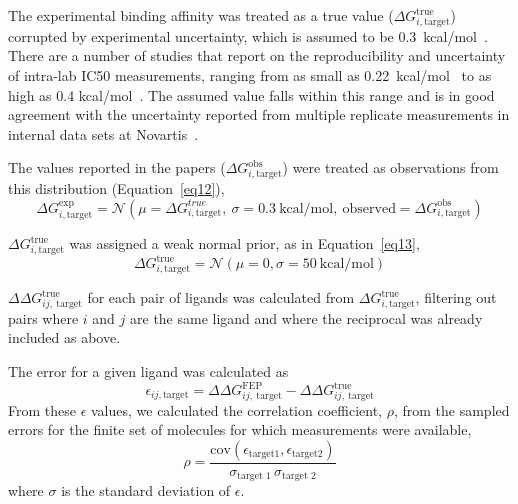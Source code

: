 \documentclass[phd,tocprelim]{cornell}
\begin{document}
The experimental binding affinity was treated as a true value ($\Delta G^\text{true}_{i,\text{target}}$) corrupted by experimental uncertainty, which is assumed to be 0.3~kcal/mol~\citep{BROWN2009420}. There are a number of studies that report on the reproducibility and uncertainty of intra-lab IC50 measurements, ranging from as small as 0.22~kcal/mol~\citep{Hauser:2018vz} to as high as 0.4 kcal/mol~\citep{BROWN2009420}. The assumed value falls within this range and is in good agreement with the uncertainty reported from multiple replicate measurements in internal data sets at Novartis~\citep{Kalliokoski:PloSOne:2013}. 

The values reported in the papers ($\Delta G^\text{obs}_{i,\text{target}}$) were treated as observations from this distribution (Equation~\ref{eq12}),
\begin{equation}
\Delta G^\text{exp}_{i,\text{target}} = \mathcal{N}(\mu=\Delta G^{true}_{i,\text{target}}, ~\sigma=0.3~\text{kcal/mol},~\text{observed} = \Delta G^\text{obs}_{i,\text{target}}) \label{eq12}
\end{equation}

$\Delta G^\text{true}_{i,\text{target}}$ was assigned a weak normal prior, as in Equation~\ref{eq13},
\begin{equation}
\Delta G^\text{true}_{i,\text{target}} = \mathcal{N}(\mu=0, \sigma=50~\text{kcal/mol}) \label{eq13}
\end{equation}

$\Delta \Delta G^\text{true}_{ij, ~\text{target}}$ for each pair of ligands was calculated from $\Delta G^\text{true}_{i,\text{target}}$, filtering out pairs where $i$ and $j$ are the same ligand and where the reciprocal was already included as above. 

The error for a given ligand was calculated as
\begin{equation}
\epsilon_{ij, \text{target}} =  \Delta \Delta G^\text{FEP}_{ij, ~\text{target}} - \Delta \Delta G^\text{true}_{ij, ~\text{target}} \label{eq9}
\end{equation}
From these $\epsilon$ values, we calculated the correlation coefficient, $\rho$, from the sampled errors for the finite set of molecules for which measurements were available,
\begin{equation}
\rho = \frac{\mathrm{cov}(\epsilon_\text{target1}, \epsilon_\text{target2})}{\sigma_\text{target 1} \, \sigma_\text{target 2}} \label{eq10}
\end{equation}
where $\sigma$ is the standard deviation of $\epsilon$. 
\end{document}
